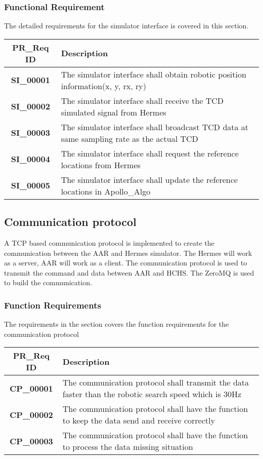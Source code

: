 \documentclass[10pt]{article}
\begin{document}
  \subsubsection{Functional Requirement}
  The detailed requirements for the simulator interface is covered in this section.
\begin{tabularx}{\textwidth}{|c|X|}
    \hline
    \textbf{PR\_Req ID} &\textbf{Description} \\ \hline
    \textbf{SI\_00001} & The simulator interface shall obtain robotic position information(x, y, rx, ry) \\ \hline
    \textbf{SI\_00002} & The simulator interface shall receive the TCD simulated signal from Hermes \\ \hline
    \textbf{SI\_00003} & The simulator interface shall broadcast TCD data at same sampling rate as the actual TCD\\ \hline
    \textbf{SI\_00004} & The simulator interface shall request the reference locations from Hermes\\ \hline
    \textbf{SI\_00005} & The simulator interface shall update the reference locations in Apollo\_Algo\\ \hline
 \end{tabularx} \par
  
  \subsection{Communication protocol}
  A TCP based communication protocol is implemented to create the communication between the AAR and Hermes simulator. The Hermes will work as a server, AAR will work as a client. The communication protocol is used to transmit the command and data between AAR and HCHS. The ZeroMQ is used to build the communication. 
  
  \subsubsection{Function Requirements}
  The requirements in the section covers the function requirements for the communication protocol 

  \begin{tabularx}{\textwidth}{|c|X|}
    \hline
    \color{black} \textbf{PR\_Req ID} &\textbf{Description} \\ \hline
    \textbf{CP\_00001} & The communication protocol shall transmit the data faster than the robotic search speed which is 30Hz \\ \hline
    \textbf{CP\_00002} & The communication protocol shall have the function to keep the data send and receive correctly  \\ \hline
    \textbf{CP\_00003} & The communication protocol shall have the function to process the data missing situation \\ \hline
 \end{tabularx} \par
 
\end{document}
